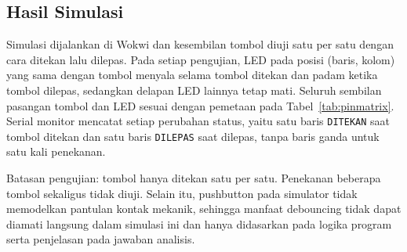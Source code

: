 \subsection{Hasil Simulasi}
Simulasi dijalankan di Wokwi dan kesembilan tombol diuji satu per satu dengan cara ditekan lalu dilepas. Pada setiap pengujian, LED pada posisi (baris, kolom) yang sama dengan tombol menyala selama tombol ditekan dan padam ketika tombol dilepas, sedangkan delapan LED lainnya tetap mati. Seluruh sembilan pasangan tombol dan LED sesuai dengan pemetaan pada Tabel~\ref{tab:pinmatrix}. Serial monitor mencatat setiap perubahan status, yaitu satu baris \texttt{DITEKAN} saat tombol ditekan dan satu baris \texttt{DILEPAS} saat dilepas, tanpa baris ganda untuk satu kali penekanan.

Batasan pengujian: tombol hanya ditekan satu per satu. Penekanan beberapa tombol sekaligus tidak diuji. Selain itu, pushbutton pada simulator tidak memodelkan pantulan kontak mekanik, sehingga manfaat debouncing tidak dapat diamati langsung dalam simulasi ini dan hanya didasarkan pada logika program serta penjelasan pada jawaban analisis.

